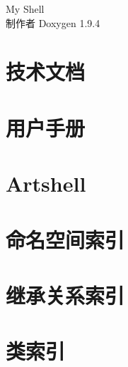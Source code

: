 \documentclass[twoside]{book}
\newcommand{\+}{\discretionary{\mbox{\scriptsize$\hookleftarrow$}}{}{}}
\newcommand{\clearemptydoublepage}{%
    \newpage{\pagestyle{empty}\cleardoublepage}%
  }
\begin{document}
  \raggedbottom
  \begin{CJK}{UTF8}{gbsn}
    \hypersetup{pageanchor=false,
                bookmarksnumbered=true,
                pdfencoding=unicode
               }
  \begin{titlepage}
  \vspace*{7cm}
  \begin{center}%
  {\Large My Shell}\\
  \vspace*{1cm}
  {\large 制作者 Doxygen 1.9.4}\\
  \end{center}
  \end{titlepage}
  \clearemptydoublepage
  \tableofcontents
  \clearemptydoublepage
  \hypersetup{pageanchor=true}
\chapter{技术文档}
\label{md__e___artshell_doc__xE6_x8A_x80_xE6_x9C_xAF_xE6_x96_x87_xE6_xA1_xA3}

\chapter{用户手册}
\label{md__e___artshell_doc__xE7_x94_xA8_xE6_x88_xB7_xE6_x89_x8B_xE5_x86_x8C}

\chapter{Artshell}
\label{md__e___artshell__r_e_a_d_m_e}

\chapter{命名空间索引}

\chapter{继承关系索引}

\chapter{类索引}


\end{CJK}
\end{document}
